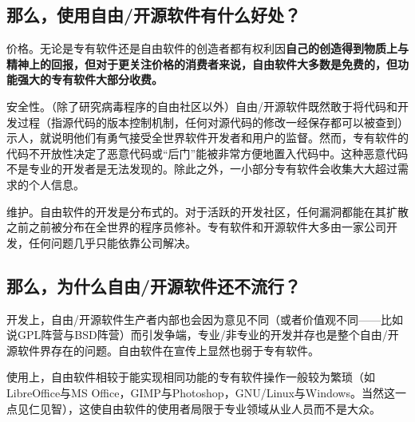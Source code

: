 \subsection{那么，使用自由/开源软件有什么好处？}
价格。无论是专有软件还是自由软件的创造者都有权利因\bf 自己的\normalall 创造得到物质上与精神上的回报，但对于更关注价格的消费者来说，自由软件大多数是免费的，但功能强大的专有软件大部分收费。\par
安全性。（除了研究病毒程序的自由社区以外）自由/开源软件既然敢于将代码和开发过程（指源代码的版本控制机制，任何对源代码的修改一经保存都可以被查到）示人，就说明他们有勇气接受全世界软件开发者和用户的监督。然而，专有软件的代码不开放性决定了恶意代码或“后门”能被非常方便地置入代码中。这种恶意代码不是专业的开发者是无法发现的。除此之外，一小部分专有软件会收集大大超过需求的个人信息。\par
维护。自由软件的开发是分布式的。对于活跃的开发社区，任何漏洞都能在其扩散之前之前被分布在全世界的程序员修补。专有软件和开源软件大多由一家公司开发，任何问题几乎只能依靠公司解决。
\subsection{那么，为什么自由/开源软件还不流行？}
开发上，自由/开源软件生产者内部也会因为意见不同（或者价值观不同——比如说GPL阵营与BSD阵营）而引发争端，专业/非专业的开发并存也是整个自由/开源软件界存在的问题。自由软件在宣传上显然也弱于专有软件。\par
使用上，自由软件相较于能实现相同功能的专有软件操作一般较为繁琐（如LibreOffice与MS Office，GIMP与Photoshop，GNU/Linux与Windows。当然这一点见仁见智），这使自由软件的使用者局限于专业领域从业人员而不是大众。